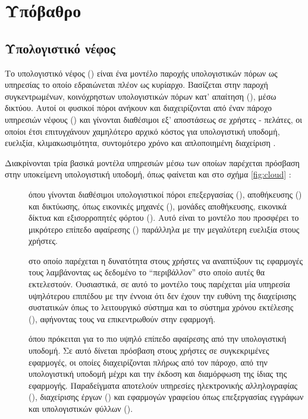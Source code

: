 \chapter{Υπόβαθρο}

\section{Υπολογιστικό νέφος}

Το υπολογιστικό νέφος () είναι ένα μοντέλο παροχής
υπολογιστικών πόρων ως υπηρεσίας το οποίο εδραιώνεται πλέον ως κυρίαρχο.
Βασίζεται στην παροχή συγκεντρωμένων, κοινόχρηστων υπολογιστικών πόρων κατ'
απαίτηση (), μέσω δικτύου. Αυτοί οι φυσικοί πόροι
ανήκουν και διαχειρίζονται από έναν πάροχο υπηρεσιών νέφους () και γίνονται διαθέσιμοι εξ' αποστάσεως σε χρήστες - πελάτες, οι
οποίοι έτσι επιτυγχάνουν χαμηλότερο αρχικό κόστος για υπολογιστική υποδομή,
ευελιξία, κλιμακωσιμότητα, συντομότερο χρόνο  και απλοποιημένη
διαχείριση \cite{wiki:cloud}.

Διακρίνονται τρία βασικά μοντέλα υπηρεσιών  μέσω των οποίων παρέχεται
πρόσβαση στην υποκείμενη υπολογιστική υποδομή, όπως φαίνεται και στο σχήμα
\ref{fig:cloud} \cite{nist-cloud}:
\begin{description}
    \item[] όπου γίνονται διαθέσιμοι
          υπολογιστικοί πόροι επεξεργασίας (), αποθήκευσης
          () και δικτύωσης, όπως εικονικές μηχανές (), μονάδες αποθήκευσης, εικονικά δίκτυα και εξισορροπητές
          φόρτου (). Αυτό είναι το μοντέλο που προσφέρει το
          μικρότερο επίπεδο αφαίρεσης () παράλληλα με την
          μεγαλύτερη ευελιξία στους χρήστες.
    \item[] στο οποίο παρέχεται η δυνατότητα
          στους χρήστες να αναπτύξουν τις εφαρμογές τους λαμβάνοντας ως δεδομένο
          το ``περιβάλλον'' στο οποίο αυτές θα εκτελεστούν. Ουσιαστικά, σε αυτό
          το μοντέλο τους παρέχεται μία υπηρεσία υψηλότερου επιπέδου με την
          έννοια ότι δεν έχουν την ευθύνη της διαχείρισης συστατικών όπως το
          λειτουργικό σύστημα και το σύστημα χρόνου εκτέλεσης (), αφήνοντας τους να επικεντρωθούν στην εφαρμογή.
    \item[] όπου πρόκειται για το πιο υψηλό
          επίπεδο αφαίρεσης από την υπολογιστική υποδομή. Σε αυτό δίνεται
          πρόσβαση στους χρήστες σε συγκεκριμένες εφαρμογές, οι οποίες
          διαχειρίζονται πλήρως από τον πάροχο, από την υπολογιστική υποδομή
          μέχρι και την έκδοση και διαμόρφωση της ίδιας της εφαρμογής.
          Παραδείγματα αποτελούν υπηρεσίες ηλεκτρονικής αλληλογραφίας
          (), διαχείρισης έργων () και
          εφαρμογών γραφείου όπως επεξεργασίας εγγράφων και υπολογιστικών φύλλων
          ().
\end{description}


